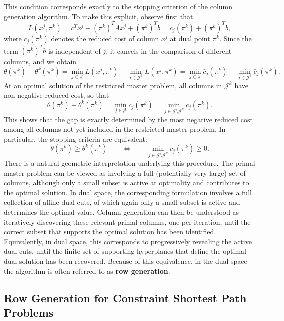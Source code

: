 \documentclass{book}
\theoremstyle{definition}
\newcounter{algorithm_}
\numberwithin{algorithm_}{chapter}
\begin{document}
This condition corresponds exactly to the stopping criterion of the column generation algorithm. To make this explicit, observe first that
\[
L(x^j,\pi^k)
= c^T x^j - (\pi^k)^T A x^j + (\pi^k)^T b
= \bar{c}_j(\pi^k) + (\pi^k)^T b,
\]
where $\bar{c}_j(\pi^k)$ denotes the reduced cost of column $x^j$ at dual point $\pi^k$.
Since the term $(\pi^k)^T b$ is independent of $j$, it cancels in the comparison of different columns, and we obtain
\[
\theta(\pi^k) - \theta^k(\pi^k)
=
\min_{j \in \mathcal{J}} L(x^j,\pi^k)
-
\min_{j \in \mathcal{J}^k} L(x^j,\pi^k)
=
\min_{j \in \mathcal{J}} \bar{c}_j(\pi^k)
-
\min_{j \in \mathcal{J}^k} \bar{c}_j(\pi^k).
\]
At an optimal solution of the restricted master problem, all columns in $\mathcal{J}^k$ have non-negative reduced cost, so that
\[
\theta(\pi^k) - \theta^k(\pi^k)
=
\min_{j \in \mathcal{J}} \bar{c}_j(\pi^k)
=
\min_{j \in \mathcal{J} \setminus \mathcal{J}^k} \bar{c}_j(\pi^k).
\]
This shows that the gap is exactly determined by the most negative reduced cost among all columns not yet included in the restricted master problem. In particular, the stopping criteria are equivalent:
\[
\theta(\pi^k) \geq \theta^k(\pi^k) \qquad \Longleftrightarrow \qquad \min_{j \in \mathcal{J} \setminus \mathcal{J}^k} \bar{c}_j(\pi^k) \ge 0.
\]
There is a natural geometric interpretation underlying this procedure. The primal master problem can be viewed as involving a full (potentially very large) set of columns, although only a small subset is active at optimality and contributes to the optimal solution. In dual space, the corresponding formulation involves a full collection of affine dual cuts, of which again only a small subset is active and determines the optimal value. Column generation can then be understood as iteratively discovering these relevant primal columns, one per iteration, until the correct subset that supports the optimal solution has been identified. Equivalently, in dual space, this corresponds to progressively revealing the active dual cuts, until the finite set of supporting hyperplanes that define the optimal dual solution has been recovered. Because of this equivalence, in the dual space the algorithm is often referred to as \textbf{row generation}.


\subsection{Row Generation for Constraint Shortest Path Problems}
\end{document}
